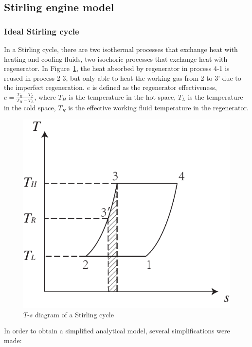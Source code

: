 \documentclass[preprint,5p, twocolumn]{elsarticle}
\begin{document}
\subsection{Stirling engine model\label{sec:StirlingEngineModel}}
\subsubsection{Ideal Stirling cycle}
In a Stirling cycle, there are two isothermal processes that exchange heat with heating and cooling fluids, two isochoric processes that exchange heat with regenerator. In Figure~\ref{fig:StirlingCycle}, the heat absorbed by regenerator in process 4-1 is reused in process 2-3, but only able to heat the working gas from 2 to 3' due to the imperfect regeneration. $e$ is defined as the regenerator effectiveness\cite{Formosa2010,Juhasz2010}, $e=\frac{T_R-T_L}{T_H-T_L}$, where $T_H$ is the temperature in the hot space, $T_L$ is the temperature in the cold space, $T_R$ is the effective working fluid temperature in the regenerator.

\noindent \begin{figure}[htbp]
\begin{center}
	\includegraphics[width = 0.7\columnwidth]{./graphics/StirlingCycle}
	\caption{$T$-$s$ diagram of a Stirling cycle}
	\label{fig:StirlingCycle}
\end{center}
\end{figure}

In order to obtain a simplified analytical model, several simplifications were made:
\end{document}
